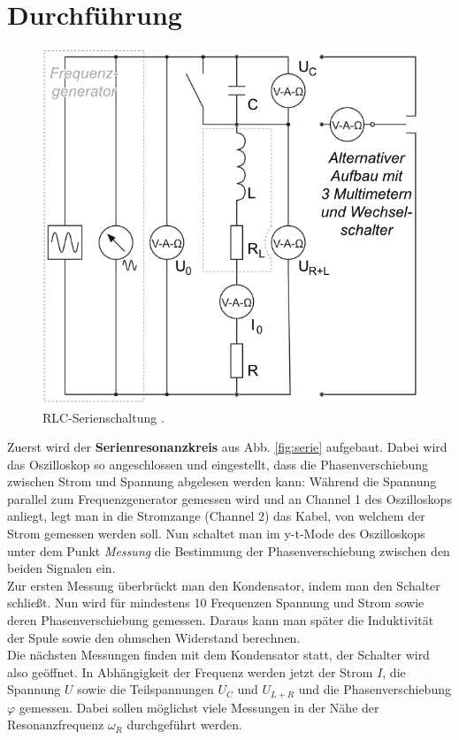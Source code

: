 \documentclass[12pt,a4paper,titlepage,headinclude,bibtotoc]{scrartcl}
\begin{document}
\section{Durchführung}
\label{sec:durchfuehrung}
\begin{figure}[!htb]
	\centering
	\includegraphics[scale=0.8]{serie.png}
	\caption{RLC-Serienschaltung \cite[Datum: 03.10.14]{LP14}.}
	\label{fig:serie}
\end{figure}

Zuerst wird der \textbf{Serienresonanzkreis} aus Abb. \eqref{fig:serie} aufgebaut.
Dabei wird das Oszilloskop so angeschlossen und eingestellt, dass die Phasenverschiebung zwischen Strom und Spannung abgelesen werden kann:
Während die Spannung parallel zum Frequenzgenerator gemessen wird und an Channel 1 des Oszilloskops anliegt, legt man in die Stromzange (Channel 2) das Kabel, von welchem der Strom gemessen werden soll.
Nun schaltet man im y-t-Mode des Oszilloskops unter dem Punkt \emph{Messung} die Bestimmung der Phasenverschiebung zwischen den beiden Signalen ein.\\
Zur ersten Messung überbrückt man den Kondensator, indem man den Schalter schließt.
Nun wird für mindestens 10 Frequenzen Spannung und Strom sowie deren Phasenverschiebung gemessen.
Daraus kann man später die Induktivität der Spule sowie den ohmschen Widerstand berechnen.\\
Die nächsten Messungen finden mit dem Kondensator statt, der Schalter wird also geöffnet.
In Abhängigkeit der Frequenz werden jetzt der Strom $I$, die Spannung $U$ sowie die Teilspannungen $U_C$ und $U_{L+R}$ und die Phasenverschiebung $\varphi$ gemessen.
Dabei sollen möglichst viele Messungen in der Nähe der Resonanzfrequenz $\omega_R$ durchgeführt werden.\\
\end{document}
